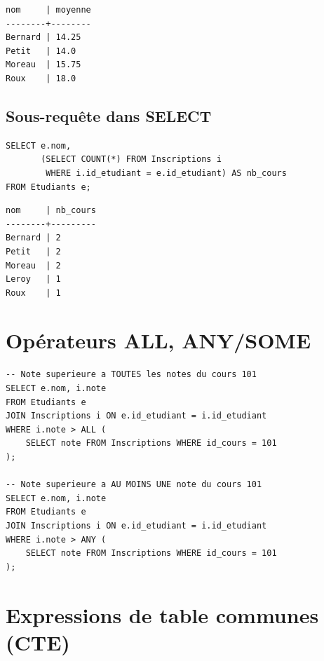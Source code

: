 \begin{codeoutput}
\begin{verbatim}
nom     | moyenne
--------+--------
Bernard | 14.25
Petit   | 14.0
Moreau  | 15.75
Roux    | 18.0
\end{verbatim}
\end{codeoutput}

\subsection{Sous-requ\^ete dans SELECT}

\begin{codeblock}[title=\textbf{Sous-requ\^ete dans SELECT}]
\begin{verbatim}
SELECT e.nom,
       (SELECT COUNT(*) FROM Inscriptions i
        WHERE i.id_etudiant = e.id_etudiant) AS nb_cours
FROM Etudiants e;
\end{verbatim}
\end{codeblock}

\begin{codeoutput}
\begin{verbatim}
nom     | nb_cours
--------+---------
Bernard | 2
Petit   | 2
Moreau  | 2
Leroy   | 1
Roux    | 1
\end{verbatim}
\end{codeoutput}

\section{Op\'erateurs ALL, ANY/SOME}

\begin{codeblock}[title=\textbf{Comparaison avec ALL et ANY}]
\begin{verbatim}
-- Note superieure a TOUTES les notes du cours 101
SELECT e.nom, i.note
FROM Etudiants e
JOIN Inscriptions i ON e.id_etudiant = i.id_etudiant
WHERE i.note > ALL (
    SELECT note FROM Inscriptions WHERE id_cours = 101
);

-- Note superieure a AU MOINS UNE note du cours 101
SELECT e.nom, i.note
FROM Etudiants e
JOIN Inscriptions i ON e.id_etudiant = i.id_etudiant
WHERE i.note > ANY (
    SELECT note FROM Inscriptions WHERE id_cours = 101
);
\end{verbatim}
\end{codeblock}

\section{Expressions de table communes (CTE)}

